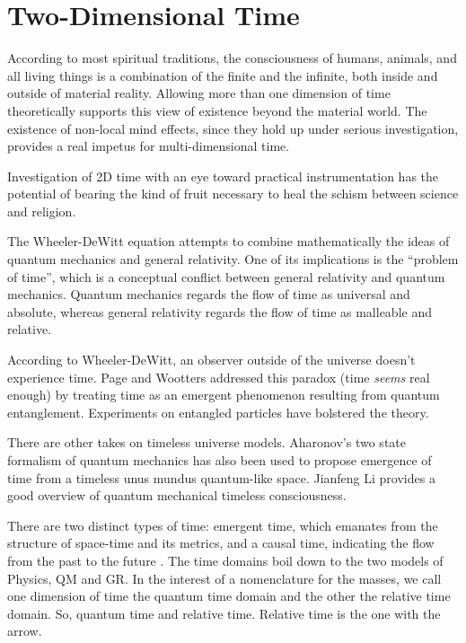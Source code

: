 \section{\label{sec:level1}Two-Dimensional Time}

According to most spiritual traditions, the consciousness of humans, animals,
and all living things is a combination of the finite and the infinite,
both inside and outside of material reality.
Allowing more than one dimension of time theoretically supports this view
of existence beyond the material world.
The existence of non-local mind effects, since they hold up under serious
investigation, provides a real impetus for multi-dimensional time.

Investigation of 2D time with an eye toward practical instrumentation has the
potential of bearing the kind of fruit necessary to heal the schism between
science and religion.

The Wheeler-DeWitt equation \cite{DeWitt} attempts to combine mathematically
the ideas of quantum mechanics and general relativity.
One of its implications is the ``problem of time'',
which is a conceptual conflict between general relativity and quantum mechanics.
Quantum mechanics regards the flow of time as universal and absolute, whereas
general relativity regards the flow of time as malleable and relative.

According to Wheeler-DeWitt, an observer outside of the universe
doesn't experience time. Page and Wootters \cite{Page} addressed this paradox
(time \textit{seems} real enough) by treating time as an emergent phenomenon
resulting from quantum entanglement.
Experiments \cite{Moreva} on entangled particles have bolstered the theory.

There are other takes on timeless universe models.
Aharonov's two state formalism of quantum mechanics has also been used
\cite{Lobo} to propose emergence of time from a timeless unus mundus
quantum-like space.
Jianfeng Li provides a good overview \cite{Jianfeng} of quantum mechanical
timeless consciousness.

There are two distinct types of time: emergent time, which emanates from the
structure of space-time and its metrics, and a causal time, indicating the flow
from the past to the future \cite{Brunet}. The time domains boil down to the
two models of Physics, QM and GR.
In the interest of a nomenclature for the masses, we call one dimension of time
the quantum time domain and the other the relative time domain.
So, quantum time and relative time. Relative time is the one with the arrow.

